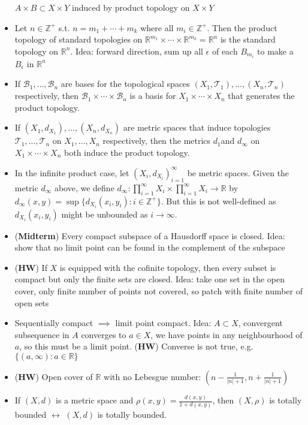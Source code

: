 \documentclass[frenchspacing,9pt,landscape,a4paper]{article}
\newcommand{\BR}{\mathbb R}
\newcommand{\BZ}{\mathbb Z}
\newcommand{\abs}[1]{\left\lvert #1 \right\rvert}
\theoremstyle{remark}
\begin{document}
\begin{multicols}{4}
\begin{itemize}
        $A\times B\subset X\times Y$ induced by product topology on  $X\times Y$
    \item Let $n\in\BZ^+$ s.t.  $n=m_1+\cdots+m_k$ where all $m_i\in\BZ^+$. Then the product topology of
        standard topologies on $\BR^{m_1}\times\cdots\times\BR^{m_k}=\BR^n$ is the standard topology on
        $\BR^n$. Idea: forward direction, sum up all $\epsilon$ of each $B_{m_i}$ to make a  $B_\epsilon$
        in  $\BR^n$
    \item If $\mathcal{B}_1,\dots,\mathcal{B}_n$ are bases for the topological spaces
        $(X_1,\mathcal{T}_1),\dots,(X_n,\mathcal{T}_n)$ respectively, then
        $\mathcal{B}_1\times\cdots\times\mathcal{B}_n$ is a basis for  $X_1\times\cdots\times X_n$
        that generates the product topology.
    \item If $(X_1,d_{X_1}),\dots,(X_n,d_{X_n})$ are metric spaces that induce topologies
        $\mathcal{T}_1,\dots,\mathcal{T}_n$ on  $X_1,\dots,X_n$ respectively, then the metrics $d_1
        $and $d_\infty$ on  $X_1\times\cdots\times X_n$ both induce the product topology.
    \item In the infinite product case, let $(X_i,d_{X_i})_{i=1}^\infty$ be metric spaces. Given the
        metric  $d_\infty$ above, we define  $d_\infty:\prod_{i=1}^\infty X_i\times\prod_{i=1}^\infty
        X_i\to\BR$ by  $d_\infty(x,y)=\sup\{d_{X_i}(x_i,y_i):i\in\BZ^+\}$. But this is not well-defined
        as  $d_{X_i}(x_i,y_i)$ might be unbounded as  $i\to\infty$.
    \item (\textbf{Midterm}) Every compact subspace of a Hausdorff space is closed. Idea: show that no
        limit point can be found in the complement of the subspace
    \item (\textbf{HW}) If $X$ is equipped with the cofinite topology, then every subset is compact but
        only the finite sets are closed. Idea: take one set in the open cover, only finite number of points
        not covered, so patch with finite number of open sets
    \item Sequentially compact $\implies$ limit point compact. Idea: $A\subset X$, convergent subsequence
        in $A$ converges to  $a\in X$, we have points in any neighbourhood of $a$, so this must be a limit
        point. (\textbf{HW}) Converse is not true, e.g. $\{(a,\infty):a\in\BR\}$
    \item (\textbf{HW}) Open cover of $\BR$ with no Lebesgue number:  $(n-\frac{1}{\abs{n}+1},n+\frac{1}{\abs{n}+1})$
    \item If $(X,d)$ is a metric space and $\rho(x,y) = \frac{d(x,y)}{1+d(x,y)}$, then $(X,\rho)$ is totally bounded $\leftrightarrow$ $(X,d)$ is totally bounded.

\end{itemize}
\end{multicols}
\end{document}
